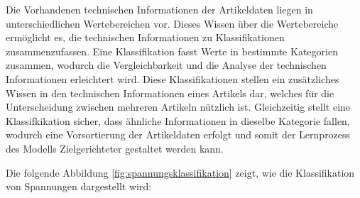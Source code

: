 Die Vorhandenen technischen Informationen der Artikeldaten liegen in unterschiedlichen Wertebereichen vor. 
Dieses Wissen über die Wertebereiche ermöglicht es, die technischen Informationen zu Klassifikationen zusammenzufassen.
Eine Klassifikation fasst Werte in bestimmte Kategorien zusammen, wodurch die Vergleichbarkeit und die Analyse der technischen Informationen erleichtert wird.
Diese Klassifikationen stellen ein zusätzliches Wissen in den technischen Informationen eines Artikels dar, welches für die Unterscheidung zwischen mehreren Artikeln nützlich ist.
Gleichzeitig stellt eine Klassifkikation sicher, dass ähnliche Informationen in dieselbe Kategorie fallen, 
wodurch eine Vorsortierung der Artikeldaten erfolgt und somit der Lernprozess des Modells Zielgerichteter gestaltet werden kann.

Die folgende Abbildung \ref{fig:spannungsklassifikation} zeigt, wie die Klassifikation von Spannungen dargestellt wird: 

